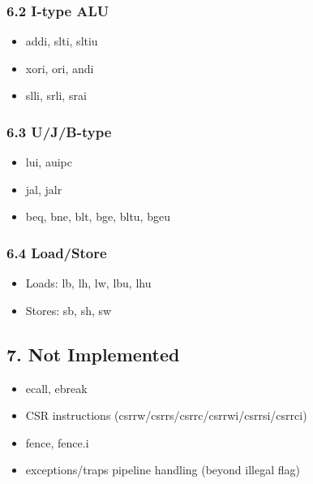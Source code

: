 \documentclass[]{article}
\providecommand{\tightlist}{%
  \setlength{\itemsep}{0pt}\setlength{\parskip}{0pt}}
\begin{document}
\hypertarget{62-i-type-alu}{%
\subsubsection{6.2 I-type ALU}\label{62-i-type-alu}}

\begin{itemize}
\tightlist
\item
  addi, slti, sltiu
\item
  xori, ori, andi
\item
  slli, srli, srai
\end{itemize}

\hypertarget{63-ujb-type}{%
\subsubsection{6.3 U/J/B-type}\label{63-ujb-type}}

\begin{itemize}
\tightlist
\item
  lui, auipc
\item
  jal, jalr
\item
  beq, bne, blt, bge, bltu, bgeu
\end{itemize}

\hypertarget{64-loadstore}{%
\subsubsection{6.4 Load/Store}\label{64-loadstore}}

\begin{itemize}
\tightlist
\item
  Loads: lb, lh, lw, lbu, lhu
\item
  Stores: sb, sh, sw
\end{itemize}

\hypertarget{7-not-implemented}{%
\subsection{7. Not Implemented}\label{7-not-implemented}}

\begin{itemize}
\tightlist
\item
  ecall, ebreak
\item
  CSR instructions (csrrw/csrrs/csrrc/csrrwi/csrrsi/csrrci)
\item
  fence, fence.i
\item
  exceptions/traps pipeline handling (beyond illegal flag)
\end{itemize}
\end{document}
